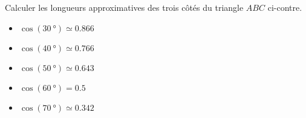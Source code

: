 
\begin{exercice}\label{exo2smath-0274}

    \begin{multicols}{2}

    Calculer les longueurs approximatives des trois côtés du triangle \( ABC\) ci-contre. 

    \begin{itemize}
        \item \( \cos(\SI{30}{\degree})\simeq 0.866\)
        \item \( \cos(\SI{40}{\degree})\simeq 0.766\)
        \item \( \cos(\SI{50}{\degree})\simeq 0.643\)
        \item \( \cos(\SI{60}{\degree})= 0.5\)
        \item \( \cos(\SI{70}{\degree})\simeq 0.342\)
    \end{itemize}

\columnbreak

\begin{center}                                                                                                            
                                        
\end{center} 
    \end{multicols}

\end{exercice}
